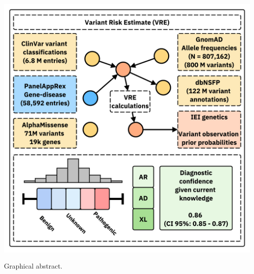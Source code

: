 \noindent\includegraphics[width=0.99\textwidth]{../images/var_risk_est_ci.pdf}

Graphical abstract.

\clearpage


